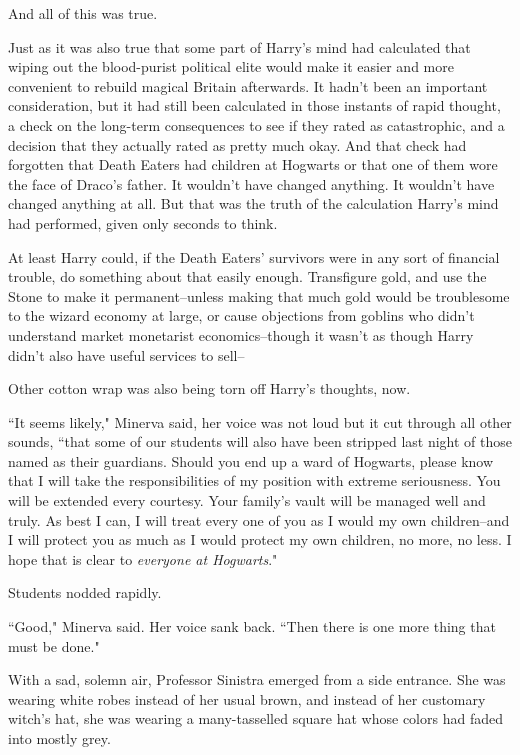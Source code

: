And all of this was true.

Just as it was also true that some part of Harry's mind had calculated that wiping out the blood-purist political elite would make it easier and more convenient to rebuild magical Britain afterwards. It hadn't been an important consideration, but it had still been calculated in those instants of rapid thought, a check on the long-term consequences to see if they rated as catastrophic, and a decision that they actually rated as pretty much okay. And that check had forgotten that Death Eaters had children at Hogwarts or that one of them wore the face of Draco's father. It wouldn't have changed anything. It wouldn't have changed anything at all. But that was the truth of the calculation Harry's mind had performed, given only seconds to think.

At least Harry could, if the Death Eaters' survivors were in any sort of financial trouble, do something about that easily enough. Transfigure gold, and use the Stone to make it permanent\---unless making that much gold would be troublesome to the wizard economy at large, or cause objections from goblins who didn't understand market monetarist economics\---though it wasn't as though Harry didn't also have useful services to sell\---

Other cotton wrap was also being torn off Harry's thoughts, now.

``It seems likely," Minerva said, her voice was not loud but it cut through all other sounds, ``that some of our students will also have been stripped last night of those named as their guardians. Should you end up a ward of Hogwarts, please know that I will take the responsibilities of my position with extreme seriousness. You will be extended every courtesy. Your family's vault will be managed well and truly. As best I can, I will treat every one of you as I would my own children\---and I will protect you as much as I would protect my own children, no more, no less. I hope that is clear to \emph{everyone at Hogwarts}."

Students nodded rapidly.

``Good," Minerva said. Her voice sank back. ``Then there is one more thing that must be done."

With a sad, solemn air, Professor Sinistra emerged from a side entrance. She was wearing white robes instead of her usual brown, and instead of her customary witch's hat, she was wearing a many-tasselled square hat whose colors had faded into mostly grey.


